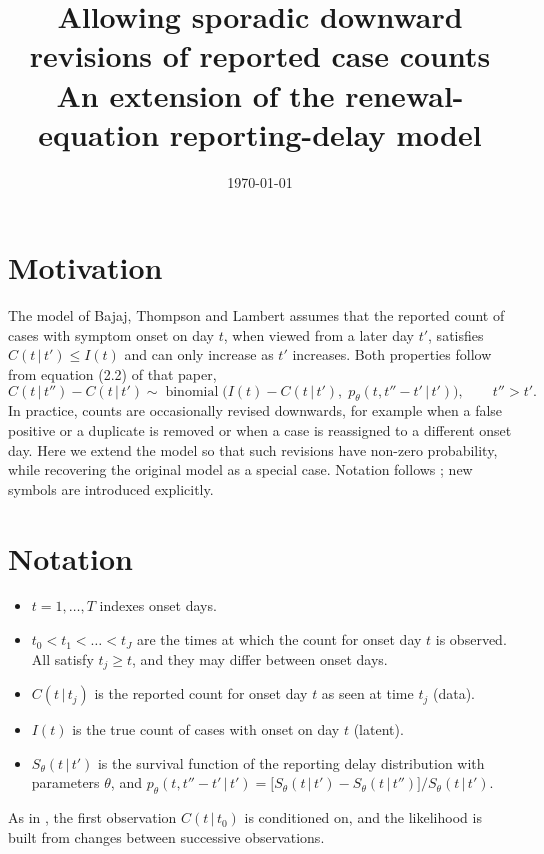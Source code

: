 \documentclass[11pt,a4paper]{article}
\title{Allowing sporadic downward revisions of reported case counts\\
\large An extension of the renewal-equation reporting-delay model}
\author{}
\date{\today}
\newcommand{\given}{\,|\,}
\newcommand{\bin}{\operatorname{binomial}}
\begin{document}
\maketitle

\section{Motivation}

The model of Bajaj, Thompson and Lambert \cite{bajaj2025} assumes that the
reported count of cases with symptom onset on day $t$, when viewed from a later
day $t'$, satisfies $C(t\given t')\le I(t)$ and can only increase as $t'$
increases. Both properties follow from equation (2.2) of that paper,
\begin{equation}\label{eq:original}
C(t\given t'') - C(t\given t') \sim
\bin\bigl(I(t) - C(t\given t'),\; p_\theta(t, t''-t'\given t')\bigr),
\qquad t''>t'.
\end{equation}
In practice, counts are occasionally revised downwards, for example when a
false positive or a duplicate is removed or when a case is reassigned to a
different onset day. Here we extend the model so that such revisions have
non-zero probability, while recovering the original model as a special case.
Notation follows \cite{bajaj2025}; new symbols are introduced explicitly.

\section{Notation}

\begin{itemize}[itemsep=2pt]
\item $t=1,\dots,T$ indexes onset days.
\item $t_0<t_1<\dots<t_J$ are the times at which the count for onset day $t$
is observed. All satisfy $t_j\ge t$, and they may differ between onset days.
\item $C(t\given t_j)$ is the reported count for onset day $t$ as seen at time
$t_j$ (data).
\item $I(t)$ is the true count of cases with onset on day $t$ (latent).
\item $S_\theta(t\given t')$ is the survival function of the reporting delay
distribution with parameters $\theta$, and
$p_\theta(t,t''-t'\given t')=\bigl[S_\theta(t\given t')-S_\theta(t\given t'')\bigr]/S_\theta(t\given t')$.
\end{itemize}
As in \cite{bajaj2025}, the first observation $C(t\given t_0)$ is conditioned
on, and the likelihood is built from changes between successive observations.
\end{document}
